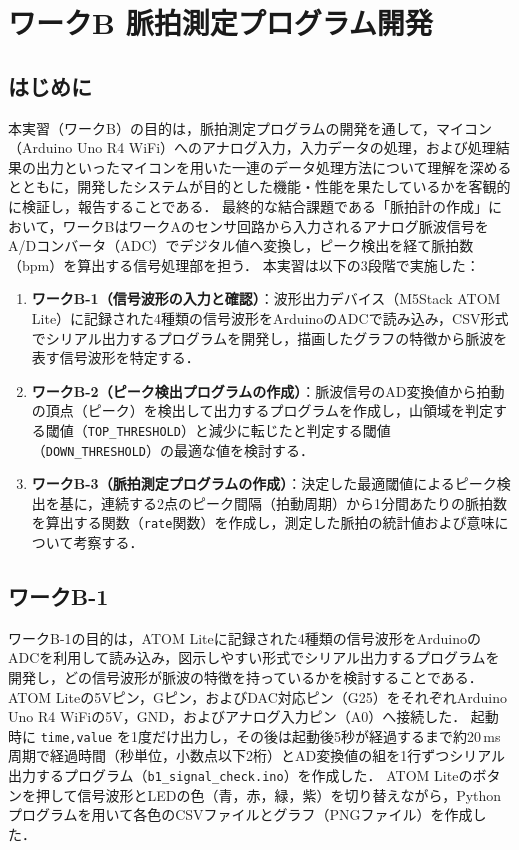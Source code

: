\chapter{ワークB 脈拍測定プログラム開発}

\section{はじめに}
本実習（ワークB）の目的は，脈拍測定プログラムの開発を通して，マイコン（Arduino Uno R4 WiFi）へのアナログ入力，入力データの処理，および処理結果の出力といったマイコンを用いた一連のデータ処理方法について理解を深めるとともに，開発したシステムが目的とした機能・性能を果たしているかを客観的に検証し，報告することである．
最終的な結合課題である「脈拍計の作成」において，ワークBはワークAのセンサ回路から入力されるアナログ脈波信号をA/Dコンバータ（ADC）でデジタル値へ変換し，ピーク検出を経て脈拍数（bpm）を算出する信号処理部を担う．
本実習は以下の3段階で実施した：
\begin{enumerate}
  \item \textbf{ワークB-1（信号波形の入力と確認）}：波形出力デバイス（M5Stack ATOM Lite）に記録された4種類の信号波形をArduinoのADCで読み込み，CSV形式でシリアル出力するプログラムを開発し，描画したグラフの特徴から脈波を表す信号波形を特定する．
  \item \textbf{ワークB-2（ピーク検出プログラムの作成）}：脈波信号のAD変換値から拍動の頂点（ピーク）を検出して出力するプログラムを作成し，山領域を判定する閾値（\texttt{TOP\_THRESHOLD}）と減少に転じたと判定する閾値（\texttt{DOWN\_THRESHOLD}）の最適な値を検討する．
  \item \textbf{ワークB-3（脈拍測定プログラムの作成）}：決定した最適閾値によるピーク検出を基に，連続する2点のピーク間隔（拍動周期）から1分間あたりの脈拍数を算出する関数（\texttt{rate}関数）を作成し，測定した脈拍の統計値および意味について考察する．
\end{enumerate}


\section{ワークB-1}
ワークB-1の目的は，ATOM Liteに記録された4種類の信号波形をArduinoのADCを利用して読み込み，図示しやすい形式でシリアル出力するプログラムを開発し，どの信号波形が脈波の特徴を持っているかを検討することである．
ATOM Liteの5Vピン，Gピン，およびDAC対応ピン（G25）をそれぞれArduino Uno R4 WiFiの5V，GND，およびアナログ入力ピン（A0）へ接続した．
起動時に \texttt{time,value} を1度だけ出力し，その後は起動後5秒が経過するまで約20\,ms周期で経過時間（秒単位，小数点以下2桁）とAD変換値の組を1行ずつシリアル出力するプログラム（\texttt{b1\_signal\_check.ino}）を作成した．
ATOM Liteのボタンを押して信号波形とLEDの色（青，赤，緑，紫）を切り替えながら，Pythonプログラムを用いて各色のCSVファイルとグラフ（PNGファイル）を作成した．

